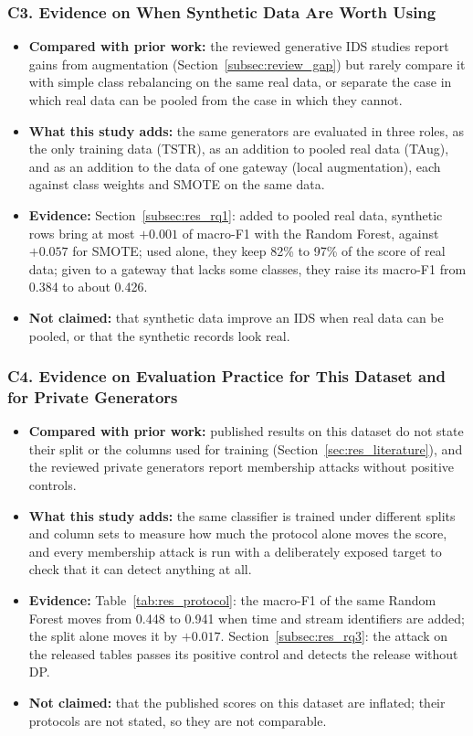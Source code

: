 \subsubsection*{C3. Evidence on When Synthetic Data Are Worth Using}
\begin{itemize}
    \item \textbf{Compared with prior work:} the reviewed generative IDS studies report gains from augmentation (Section~\ref{subsec:review_gap}) but rarely compare it with simple class rebalancing on the same real data, or separate the case in which real data can be pooled from the case in which they cannot.
    \item \textbf{What this study adds:} the same generators are evaluated in three roles, as the only training data (TSTR), as an addition to pooled real data (TAug), and as an addition to the data of one gateway (local augmentation), each against class weights and SMOTE on the same data.
    \item \textbf{Evidence:} Section~\ref{subsec:res_rq1}: added to pooled real data, synthetic rows bring at most $+0.001$ of macro-F1 with the Random Forest, against $+0.057$ for SMOTE; used alone, they keep 82\% to 97\% of the score of real data; given to a gateway that lacks some classes, they raise its macro-F1 from 0.384 to about 0.426.
    \item \textbf{Not claimed:} that synthetic data improve an IDS when real data can be pooled, or that the synthetic records look real.
\end{itemize}

\subsubsection*{C4. Evidence on Evaluation Practice for This Dataset and for Private Generators}
\begin{itemize}
    \item \textbf{Compared with prior work:} published results on this dataset do not state their split or the columns used for training (Section~\ref{sec:res_literature}), and the reviewed private generators report membership attacks without positive controls.
    \item \textbf{What this study adds:} the same classifier is trained under different splits and column sets to measure how much the protocol alone moves the score, and every membership attack is run with a deliberately exposed target to check that it can detect anything at all.
    \item \textbf{Evidence:} Table~\ref{tab:res_protocol}: the macro-F1 of the same Random Forest moves from 0.448 to 0.941 when time and stream identifiers are added; the split alone moves it by $+0.017$. Section~\ref{subsec:res_rq3}: the attack on the released tables passes its positive control and detects the release without DP.
    \item \textbf{Not claimed:} that the published scores on this dataset are inflated; their protocols are not stated, so they are not comparable.
\end{itemize}

